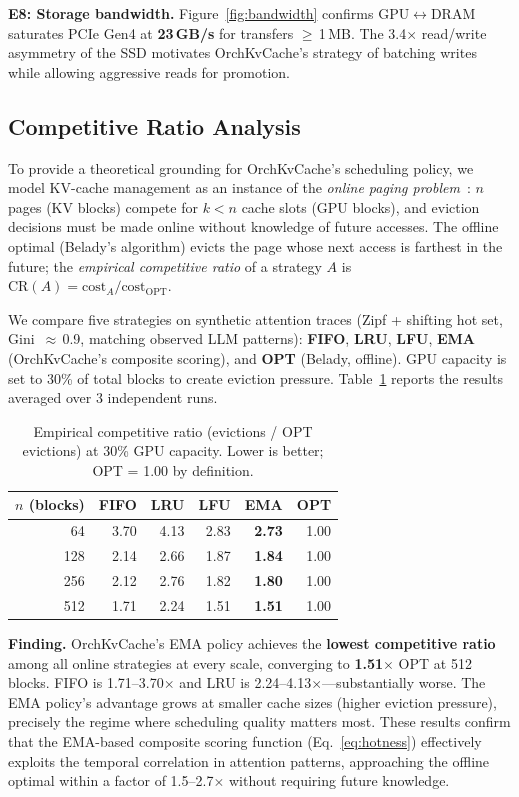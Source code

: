 \documentclass[conference]{IEEEtran}
\begin{document}
\textbf{E8: Storage bandwidth.} Figure~\ref{fig:bandwidth} confirms GPU$\leftrightarrow$DRAM saturates PCIe Gen4 at \textbf{23\,GB/s} for transfers $\geq$\,1\,MB. The 3.4$\times$ read/write asymmetry of the SSD motivates OrchKvCache's strategy of batching writes while allowing aggressive reads for promotion.

\subsection{Competitive Ratio Analysis}
\label{sec:competitive-ratio}

To provide a theoretical grounding for OrchKvCache's scheduling policy, we model KV-cache management as an instance of the \emph{online paging problem}~\cite{sleator-tarjan}: $n$ pages (KV blocks) compete for $k < n$ cache slots (GPU blocks), and eviction decisions must be made online without knowledge of future accesses. The offline optimal (Belady's algorithm) evicts the page whose next access is farthest in the future; the \emph{empirical competitive ratio} of a strategy $A$ is $\text{CR}(A) = \text{cost}_A / \text{cost}_{\text{OPT}}$.

We compare five strategies on synthetic attention traces (Zipf + shifting hot set, Gini~$\approx$\,0.9, matching observed LLM patterns): \textbf{FIFO}, \textbf{LRU}, \textbf{LFU}, \textbf{EMA} (OrchKvCache's composite scoring), and \textbf{OPT} (Belady, offline). GPU capacity is set to 30\% of total blocks to create eviction pressure. Table~\ref{tab:cr} reports the results averaged over 3 independent runs.

\begin{table}[t]
\centering
\caption{Empirical competitive ratio (evictions / OPT evictions) at 30\% GPU capacity. Lower is better; OPT = 1.00 by definition.}
\label{tab:cr}
\small
\begin{tabular}{@{}rrrrrr@{}}
\toprule
$n$ (blocks) & FIFO & LRU & LFU & \textbf{EMA} & OPT \\
\midrule
64  & 3.70 & 4.13 & 2.83 & \textbf{2.73} & 1.00 \\
128 & 2.14 & 2.66 & 1.87 & \textbf{1.84} & 1.00 \\
256 & 2.12 & 2.76 & 1.82 & \textbf{1.80} & 1.00 \\
512 & 1.71 & 2.24 & 1.51 & \textbf{1.51} & 1.00 \\
\bottomrule
\end{tabular}
\end{table}

\textbf{Finding.} OrchKvCache's EMA policy achieves the \textbf{lowest competitive ratio} among all online strategies at every scale, converging to \textbf{1.51$\times$} OPT at 512 blocks. FIFO is 1.71--3.70$\times$ and LRU is 2.24--4.13$\times$---substantially worse. The EMA policy's advantage grows at smaller cache sizes (higher eviction pressure), precisely the regime where scheduling quality matters most. These results confirm that the EMA-based composite scoring function (Eq.~\ref{eq:hotness}) effectively exploits the temporal correlation in attention patterns, approaching the offline optimal within a factor of 1.5--2.7$\times$ without requiring future knowledge.
\end{document}
